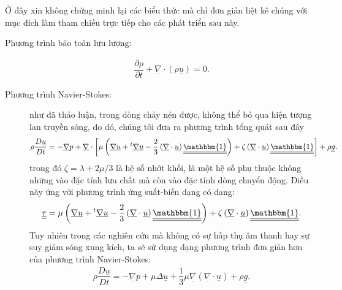 \documentclass[../../../main.tex]{subfiles}
\begin{document}
	Ở đây xin không chứng minh lại các biểu thức mà chỉ đơn giản liệt kê chúng với mục đích làm tham chiếu trực tiếp cho các phát triển sau này.
		\begin{description}
			\item[Phương trình bảo toàn lưu lượng:]
				\begin{align}\label{eq:conserve_mass}
					\dfrac{\partial\rho}{\partial t}+\underline{\nabla}\cdot\left(\rho\underline{u}\right)=0.
				\end{align}
			\item[Phương trình Navier-Stokes:] như đã thảo luận, trong dòng chảy nén được, không thể bỏ qua hiện tượng lan truyền sóng, do dó, chúng tôi đưa ra phương trình tổng quát sau đây
			\begin{align}\label{eq:nse}
				\rho\dfrac{D\underline{u}}{Dt}=-\underline{\nabla}p+\underline{\nabla}\cdot\left[\mu\left(\underline{\nabla}\underline{u}+{}^t\underline{\nabla}\underline{u}-\dfrac{2}{3}\left(\underline{\nabla}\cdot\underline{u}\right)\underline{\underline{\mathbbm{1}}}\right)+\zeta\left(\underline{\nabla}\cdot\underline{u}\right)\underline{\underline{\mathbbm{1}}}\right]+\rho\underline{g}.
			\end{align}
			trong đó $\zeta=\lambda+2\mu/3$ là hệ số nhớt khối, là một hệ số phụ thuộc không những vào đặc tính lưu chất mà còn vào đặc tính dòng chuyển động. Điều này ứng với phương trình ứng suất-biến dạng có dạng:
				\begin{align}
					\underline{\underline{\tau}}=\mu\left(\underline{\nabla}\underline{u}+{}^t\underline{\nabla}\underline{u}-\dfrac{2}{3}\left(\underline{\nabla}\cdot\underline{u}\right)\underline{\underline{\mathbbm{1}}}\right)+\zeta\left(\underline{\nabla}\cdot\underline{u}\right)\underline{\underline{\mathbbm{1}}}.
				\end{align}
			Tuy nhiên trong các nghiên cứu mà không có sự hấp thụ âm thanh hay sự suy giảm sóng xung kích, ta sẽ sử dụng dạng phương trình đơn giản hơn của phương trình Navier-Stokes:
				\begin{align}
					\boxed{
						\rho\dfrac{D\underline{u}}{Dt}=-\underline{\nabla}p+\mu\Delta\underline{u}+\dfrac{1}{3}\mu\underline{\nabla}\left(\underline{\nabla}\cdot\underline{u}\right)+\rho\underline{g}.
					}
				\end{align}
		\end{description}
\end{document}
